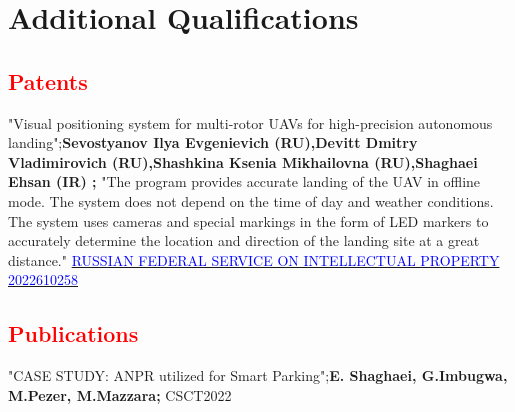 \section{Additional Qualifications}

\renewcommand{\labelitemi}{o}
\subsection{\textbf{\textcolor{red}{Patents}}}
    {"Visual positioning system for multi-rotor UAVs for high-precision autonomous landing";\textbf{Sevostyanov Ilya Evgenievich (RU),Devitt Dmitry Vladimirovich (RU),Shashkina Ksenia Mikhailovna (RU),Shaghaei Ehsan (IR) ;} "The program provides accurate landing of the UAV in offline mode. The system does not depend on the time of day and weather conditions. The system uses cameras and special markings in the form of LED markers to accurately determine the location and direction of the landing site at a great distance."  \href{https://new.fips.ru/registers-doc-view/fips_servlet?DB=EVM&DocNumber=2022610258}{\textcolor{blue}{RUSSIAN FEDERAL SERVICE
ON INTELLECTUAL PROPERTY 2022610258} }}

\subsection{\textbf{\textcolor{red}{Publications}}}
	
    {"CASE STUDY: ANPR utilized for Smart Parking";\textbf{E. Shaghaei, G.Imbugwa, M.Pezer, M.Mazzara;} CSCT2022}
    
    

